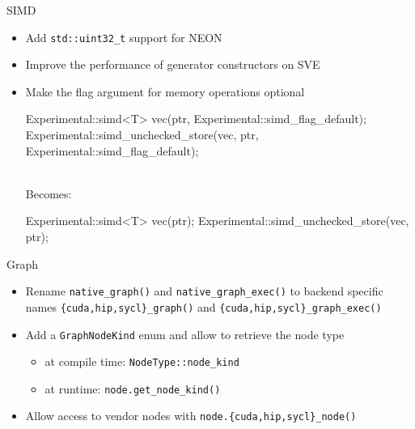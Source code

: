 
\begin{frame}[fragile]{SIMD}
  \begin{itemize}
    \item Add \texttt{std::uint32\_t} support for NEON
    \item Improve the performance of generator constructors on SVE
    \item Make the flag argument for memory operations optional
    \begin{code}[breakatwhitespace=true,breaklines=true,language=C++]
Experimental::simd<T> vec(ptr, Experimental::simd_flag_default);
Experimental::simd_unchecked_store(vec, ptr, Experimental::simd_flag_default);
    \end{code} \\
      Becomes:
    \begin{code}[language=C++]
Experimental::simd<T> vec(ptr);
Experimental::simd_unchecked_store(vec, ptr);
    \end{code}
  \end{itemize}
\end{frame}


\begin{frame}[fragile]{Graph}
  \begin{itemize}
    \item Rename \texttt{native\_graph()} and \texttt{native\_graph\_exec()} to backend specific names \texttt{\{cuda,hip,sycl\}\_graph()} and \texttt{\{cuda,hip,sycl\}\_graph\_exec()}
    \item Add a \texttt{GraphNodeKind} enum and allow to retrieve the node type
    \begin{itemize}
      \item at compile time: \texttt{NodeType::node\_kind}
      \item at runtime: \texttt{node.get\_node\_kind()}
    \end{itemize}
    \item Allow access to vendor nodes with \texttt{node.\{cuda,hip,sycl\}\_node()}
  \end{itemize}
\end{frame}


